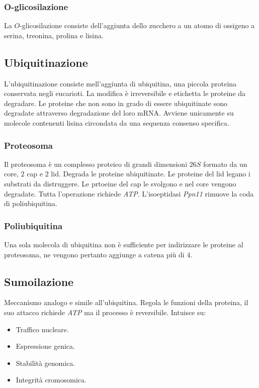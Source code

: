 		\subsubsection{O-glicosilazione}
		La $O$-glicosilazione consiste dell'aggiunta dello zucchero a un atomo di ossigeno a serina, treonina, prolina e lisina.

	\subsection{Ubiquitinazione}
	L'ubiquitinazione consiste mell'aggiunta di ubiquitina, una piccola proteina conservata negli eucarioti.
	La modifica \`e irreversibile e etichetta le proteine da degradare.
	Le proteine che non sono in grado di essere ubiquitinate sono degradate attraverso degradazione del loro mRNA.
	Avviene unicamente su molecole contenenti lisina circondata da una sequenza consenso specifica.

		\subsubsection{Proteosoma}
		Il proteosoma \`e un complesso proteico di grandi dimensioni $26S$ formato da un core, $2$ cap e $2$ lid.
		Degrada le proteine ubiquitinate.
		Le proteine del lid legano i substrati da distruggere.
		Le prtoeine del cap le svolgono e nel core vengono degradate.
		Tutta l'operazione richiede \emph{ATP}.
		L'isoeptidasi \emph{Ppn11} rimuove la coda di poliubiquitina.

		\subsubsection{Poliubiquitina}
		Una sola molecola di ubiquitina non \`e sufficiente per indirizzare le proteine al proteosoma, ne vengono pertanto aggiunge a catena pi\`u di $4$.


	\subsection{Sumoilazione}
	Meccanismo analogo e simile all'ubiquitina. 
	Regola le funzioni della proteina, il suo attacco richiede \emph{ATP} ma il processo \`e reversibile.
	Intuisce su:
	\begin{multicols}{2}
		\begin{itemize}
			\item Traffico nucleare.
			\item Espressione genica.
			\item Stabilit\`a genomica.
			\item Integrit\`a cromosomica.
		\end{itemize}
	\end{multicols}

